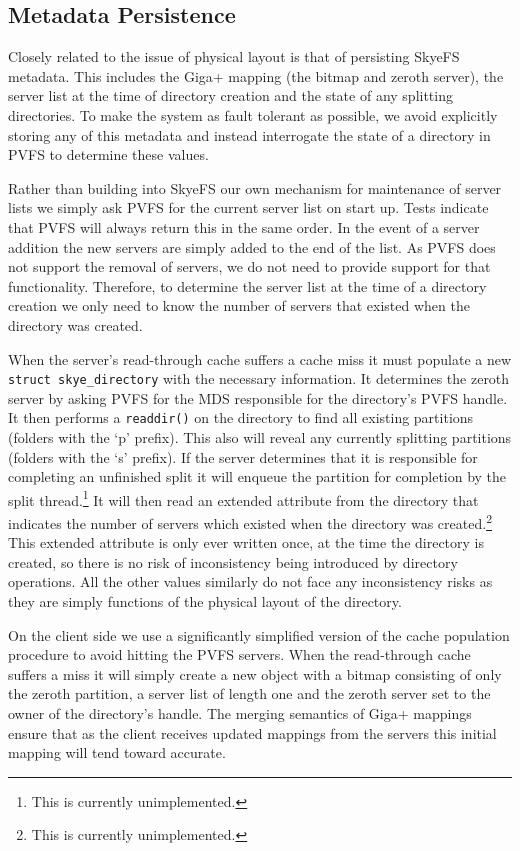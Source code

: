 \documentclass[twocolumn,letterpaper]{article}
\newcommand{\code}[1]{\texttt{#1}}
\begin{document}
\subsection{Metadata Persistence}
Closely related to the issue of physical layout is that of persisting SkyeFS
metadata.  This includes the Giga+ mapping (the bitmap and zeroth server), the
server list at the time of directory creation and the state of any splitting
directories.  To make the system as fault tolerant as possible, we avoid
explicitly storing any of this metadata and instead interrogate the state of a
directory in PVFS to determine these values.

Rather than building into SkyeFS our own mechanism for maintenance of server
lists we simply ask PVFS for the current server list on start up.  Tests indicate
that PVFS will always return this in the same order.  In the event of a server
addition the new servers are simply added to the end of the list.  As PVFS does
not support the removal of servers, we do not need to provide support for that
functionality.  Therefore, to determine the server list at the time of a
directory creation we only need to know the number of servers that existed when
the directory was created.

When the server's read-through cache suffers a cache miss it must populate a new
\code{struct skye\_\-directory} with the necessary information.  It determines
the zeroth server by asking PVFS for the MDS responsible for the directory's
PVFS handle.  It then performs a \code{readdir()} on the directory to find all
existing partitions (folders with the `p' prefix).  This also will reveal any
currently splitting partitions (folders with the `s' prefix).  If the server
determines that it is responsible for completing an unfinished split it will
enqueue the partition for completion by the split thread.\footnote{This is
currently unimplemented.} It will then read an extended attribute from the
directory that indicates the number of servers which existed when the
directory was created.\footnote{This is currently unimplemented.}  This
extended attribute is only ever written once, at the time the directory is
created, so there is no risk of inconsistency being introduced by directory
operations.  All the other values similarly do not face any inconsistency
risks as they are simply functions of the physical layout of the directory.

On the client side we use a significantly simplified version of the cache
population procedure to avoid hitting the PVFS servers.  When the read-through
cache suffers a miss it will simply create a new object with a bitmap consisting
of only the zeroth partition, a server list of length one and the zeroth server
set to the owner of the directory's handle.  The merging semantics of Giga+
mappings ensure that as the client receives updated mappings from the servers
this initial mapping will tend toward accurate.
\end{document}
